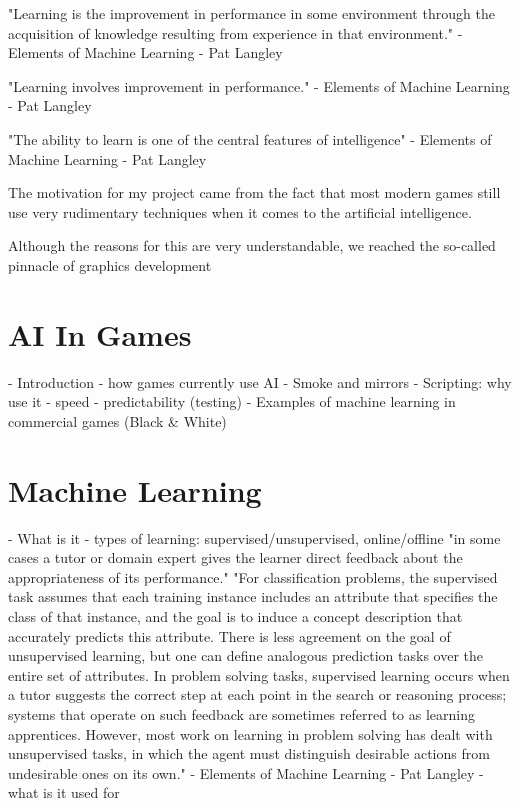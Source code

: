 \documentclass[a4paper,oneside]{report}
\begin{document}
"Learning is the improvement in performance in some environment through the acquisition of knowledge resulting from experience in that environment." - Elements of Machine Learning - Pat Langley

"Learning involves improvement in performance." - Elements of Machine Learning - Pat Langley

"The ability to learn is one of the central features of intelligence" - Elements of Machine Learning - Pat Langley

The motivation for my project came from the fact that most modern games still use very rudimentary techniques when it comes to the artificial intelligence.

Although the reasons for this are very understandable, we reached the so-called pinnacle of graphics development 


\section{AI In Games}
- Introduction - how games currently use AI
- Smoke and mirrors
- Scripting: why use it
	- speed
	- predictability (testing) 
- Examples of machine learning in commercial games (Black \& White)

\section{Machine Learning}

- What is it
- types of learning: supervised/unsupervised, online/offline
"in some cases a tutor or domain expert gives the learner direct feedback about the appropriateness of its performance."
"For classification problems, the supervised task assumes that each training instance includes an attribute that specifies the class of that instance, and the goal is to induce a concept description that accurately predicts this attribute. There is less agreement on the goal of unsupervised learning, but one can define analogous prediction tasks over the entire set of attributes. In problem solving tasks, supervised learning occurs when a tutor suggests the correct step at each point in the search or reasoning process; systems that operate on such feedback are sometimes referred to as learning apprentices. However, most work on learning in problem solving has dealt with unsupervised tasks, in which the agent must distinguish desirable actions from undesirable ones on its own." - Elements of Machine Learning - Pat Langley
- what is it used for 
\end{document}
